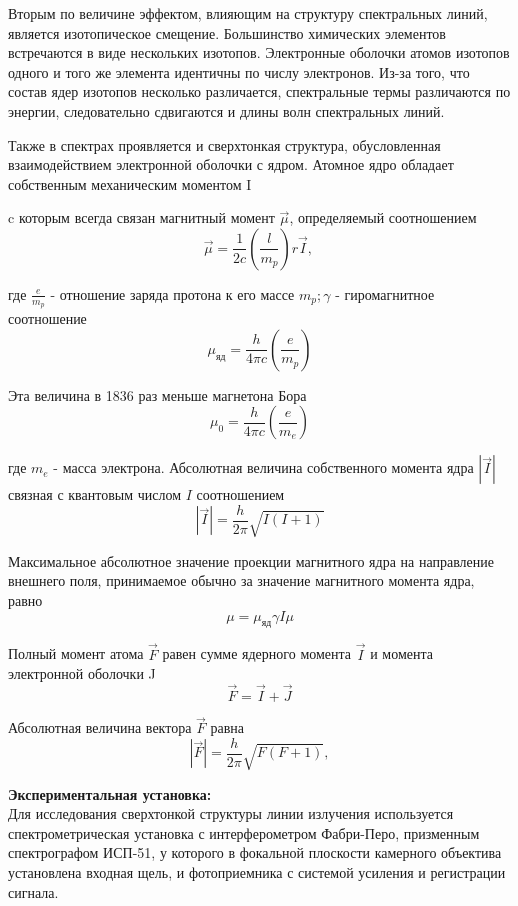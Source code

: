 \documentclass[a4paper, 12pt]{article}%
\begin{document}
	Вторым по величине эффектом, влияющим на структуру спектральных линий, является изотопическое смещение. Большинство химических элементов встречаются в виде нескольких изотопов. Электронные оболочки атомов изотопов одного и того же элемента идентичны по числу электронов. Из-за того, что состав ядер изотопов несколько различается, спектральные термы различаются по энергии, следовательно сдвигаются и длины волн спектральных линий.
	
	Также в спектрах проявляется и сверхтонкая структура, обусловленная взаимодействием электронной оболочки с ядром. Атомное ядро обладает собственным механическим моментом I
	
	c которым всегда связан магнитный момент $\vec{\mu}$, определяемый соотношением
	$$
	 \vec{\mu}=\frac{1}{2 c}\left(\frac{l}{m_p}\right) r \vec{I} \text {, }
	$$
	
	где $\frac{e}{m_p}$ - отношение заряда протона к его массе $m_p ; \gamma$ - гиромагнитное соотношение
	$$
	\mu_{\text{яд}}=\frac{h}{4 \pi c}\left(\frac{e}{m_p}\right) 
	$$
	
	Эта величина в 1836 раз меньше магнетона Бора
	$$
	\mu_0=\frac{h}{4 \pi c}\left(\frac{e}{m_e}\right)
	$$
	
	где $m_e$ - масса электрона. Абсолютная величина собственного момента ядра $|\vec{I}|$ связная с квантовым числом $I$ соотношением
	$$
	|\vec{I}|=\frac{h}{2 \pi} \sqrt{I(I+1)}
	$$
	
	
	Максимальное абсолютное значение проекции магнитного ядра на направление внешнего поля, принимаемое обычно за значение магнитного момента ядра, равно
	$$
	\mu=\mu_{\text{яд}} \gamma I \mu
	$$
	
	Полный момент атома $\vec{F}$ равен сумме ядерного момента $\vec{I}$ и момента электронной оболочки J
	$$
	\vec{F}=\vec{I}+\vec{J} 
	$$
	
	Абсолютная величина вектора $\vec{F}$ равна
	$$
	|\vec{F}|=\frac{h}{2 \pi} \sqrt{F(F+1)},
	$$
	
	\textbf{Экспериментальная установка: }\\
	
	Для исследования сверхтонкой структуры линии излучения используется спектрометрическая установка с интерферометром Фабри-Перо, призменным спектрографом ИСП-51, у которого в фокальной плоскости камерного объектива установлена входная щель, и фотоприемника с системой усиления и регистрации сигнала.
	
\end{document}
